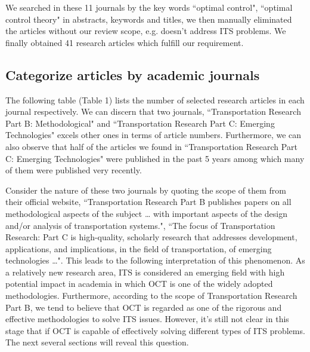 \documentclass[12pt,onecolumn,twoside]{JCTA}
\theoremstyle{mystyle}
\begin{document}
We searched in these 11 journals by the key words ``optimal control", ``optimal control theory" in abstracts, keywords and titles, we then manually eliminated the articles without our review scope, e.g. doesn{\textquoteright}t address ITS problems. We finally obtained 41 research articles which fulfill our requirement.

\subsection{Categorize articles by academic journals}
The following table (Table 1) lists the number of selected research articles in each journal respectively. We can discern that two journals, ``Transportation Research Part B: Methodological" and ``Transportation Research Part C: Emerging Technologies" excels other ones in terms of article numbers. Furthermore, we can also observe that half of the articles we found in ``Transportation Research Part C: Emerging Technologies" were published in the past 5 years among which many of them were published very recently.

Consider the nature of these two journals by quoting the scope of them from their official website, ``Transportation Research Part B publishes papers on all methodological aspects of the subject … with important aspects of the design and/or analysis of transportation systems.", ``The focus of Transportation Research: Part C is high-quality, scholarly research that addresses development, applications, and implications, in the field of transportation, of emerging technologies …". This leads to the following interpretation of this phenomenon. As a relatively new research area, ITS is considered an emerging field with high potential impact in academia in which OCT is one of the widely adopted methodologies. Furthermore, according to the scope of Transportation Research Part B, we tend to believe that OCT is regarded as one of the rigorous and effective methodologies to solve ITS issues. However, it{\textquoteright}s still not clear in this stage that if OCT is capable of effectively solving different types of ITS problems. The next several sections will reveal this question.
\end{document}
